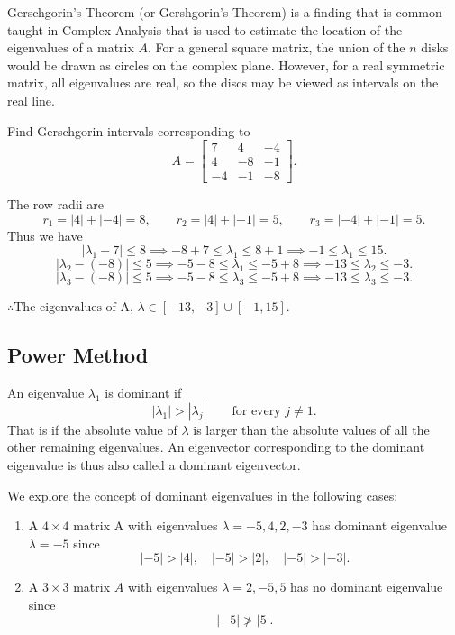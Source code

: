 Gerschgorin's Theorem (or Gershgorin's Theorem) is a finding that is common taught in Complex Analysis that is used to estimate the location of the eigenvalues of a matrix $A$. For a general square matrix, the union of the $n$ disks would be drawn as circles on the complex plane. However, for a real symmetric matrix, all eigenvalues are real, so the discs may be viewed as intervals on the real line.

\begin{example}
Find Gerschgorin intervals corresponding to
\[
 A=\begin{bmatrix}
7&4&-4\\
4&-8&-1\\
-4&-1&-8
\end{bmatrix}.
\]
\end{example}

\begin{solution}[3.8cm]
The row radii are
\[
 r_1=|4|+|-4|=8,
 \qquad r_2=|4|+|-1|=5,
 \qquad r_3=|-4|+|-1|=5.
\]
Thus we have
\[
|\lambda_1 - 7| \leq 8 \implies -8+7 \leq \lambda_1 \leq 8+1 \implies -1 \leq \lambda_1 \leq 15.
\]
\[
|\lambda_2 - (-8)| \leq 5 \implies -5-8 \leq \lambda_1 \leq -5+8 \implies -13 \leq \lambda_2 \leq -3.
\]
\[
|\lambda_3 - (-8)| \leq 5 \implies -5-8 \leq \lambda_3 \leq -5+8 \implies -13 \leq \lambda_3 \leq -3.
\]

\(\displaystyle \therefore \text{The eigenvalues of A, } \lambda \in [-13, -3] \cup [-1,15]\).
\end{solution}

\subsection{Power Method}

\begin{definition}
An eigenvalue $\lambda_1$ is dominant if
\[
 |\lambda_1|>|\lambda_j|
 \qquad\text{for every }j\ne1.
\]
That is if the absolute value of $\lambda$ is larger than the absolute values of all the other remaining eigenvalues. An eigenvector corresponding to the dominant eigenvalue is thus also called a dominant eigenvector.
\end{definition}

\begin{example}
We explore the concept of dominant eigenvalues in the following cases:
\begin{enumerate}[label=(\alph*),leftmargin=2.7em]
\item A $4\times 4$ matrix A with eigenvalues $\lambda=-5,4,2,-3$ has dominant eigenvalue $\lambda = -5$ since 
\[\lvert -5\rvert > \lvert 4\rvert,\quad
\lvert -5\rvert > \lvert 2\rvert,\quad
\lvert -5\rvert > \lvert -3\rvert.\]
\item A $3\times 3$ matrix $A$ with eigenvalues $\lambda=2,-5,5$ has no dominant eigenvalue since \[\lvert -5 \rvert \ngtr \lvert 5 \rvert.\]
\end{enumerate}
\end{example}

